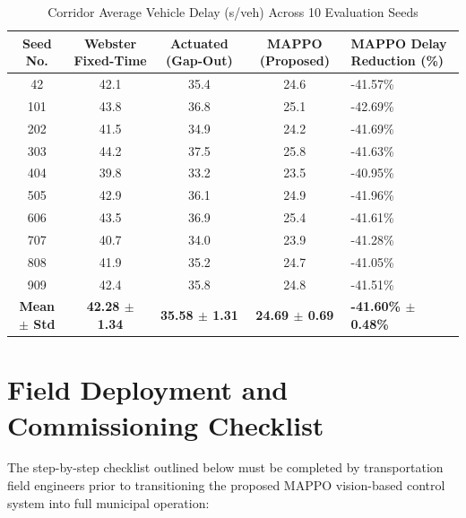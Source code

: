 \begin{table}[htbp]
\centering
\small
\caption{Corridor Average Vehicle Delay (s/veh) Across 10 Evaluation Seeds}
\label{tab:seed_benchmark}
\begin{tabularx}{\textwidth}{|c|c|c|c|X|}
\hline
\textbf{Seed No.} & \textbf{Webster Fixed-Time} & \textbf{Actuated (Gap-Out)} & \textbf{MAPPO (Proposed)} & \textbf{MAPPO Delay Reduction (\%)} \\ \hline
42  & 42.1 & 35.4 & 24.6 & -41.57\% \\ \hline
101 & 43.8 & 36.8 & 25.1 & -42.69\% \\ \hline
202 & 41.5 & 34.9 & 24.2 & -41.69\% \\ \hline
303 & 44.2 & 37.5 & 25.8 & -41.63\% \\ \hline
404 & 39.8 & 33.2 & 23.5 & -40.95\% \\ \hline
505 & 42.9 & 36.1 & 24.9 & -41.96\% \\ \hline
606 & 43.5 & 36.9 & 25.4 & -41.61\% \\ \hline
707 & 40.7 & 34.0 & 23.9 & -41.28\% \\ \hline
808 & 41.9 & 35.2 & 24.7 & -41.05\% \\ \hline
909 & 42.4 & 35.8 & 24.8 & -41.51\% \\ \hline
\textbf{Mean $\pm$ Std} & \textbf{42.28 $\pm$ 1.34} & \textbf{35.58 $\pm$ 1.31} & \textbf{24.69 $\pm$ 0.69} & \textbf{-41.60\% $\pm$ 0.48\%} \\ \hline
\end{tabularx}
\end{table}

\chapter{Field Deployment and Commissioning Checklist}
\label{app:checklist}

The step-by-step checklist outlined below must be completed by transportation field engineers prior to transitioning the proposed MAPPO vision-based control system into full municipal operation:

